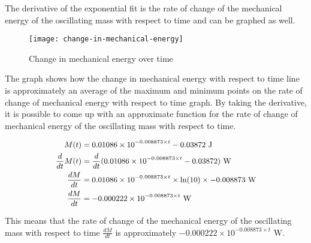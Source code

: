 \documentclass[titlepage]{article}
\begin{document}
                
                The derivative of the exponential fit is the rate of change of the mechanical energy of the oscillating mass with respect to time and can be graphed as well.
                
                \begin{figure}[H]
                    \centering
                    \texttt{[image: change-in-mechanical-energy]}
                    \caption{Change in mechanical energy over time}
                    \label{fig:change-in-mechanical-energy}
                \end{figure}
                
                The graph shows how the change in mechanical energy with respect to time line is approximately an average of the maximum and minimum points on the rate of change of mechanical energy with respect to time graph.
                By taking the derivative, it is possible to come up with an approximate function for the rate of change of mechanical energy of the oscillating mass with respect to time.
                
                
                
                \begin{equation}
                    \small
                    \begin{aligned}
                        M(t) &= 0.01086 \times 10^{-0.008873 \times t} - 0.03872 \text{ J}\\
                        \frac{d}{dt} M(t) &= \frac{d}{dt} (0.01086 \times 10^{-0.008873 \times t} - 0.03872) \text{ W}\\
                        \frac{dM}{dt} &= 0.01086 \times 10^{-0.008873 \times t} \times \ln(10) \times -0.008873 \text{ W}\\
                        \frac{dM}{dt} &= -0.000222 \times 10^{-0.008873 \times t} \text{ W}\\
                    \end{aligned}\label{eq:rate-of-change-of-mechanical-energy-over-time-exponential-fit}
                \end{equation}
                
                This means that the rate of change of the mechanical energy of the oscillating mass with respect to time $\frac{dM}{dt}$ is approximately $-0.000222 \times 10^{-0.008873 \times t} \text{ W}$.
        
\end{document}
